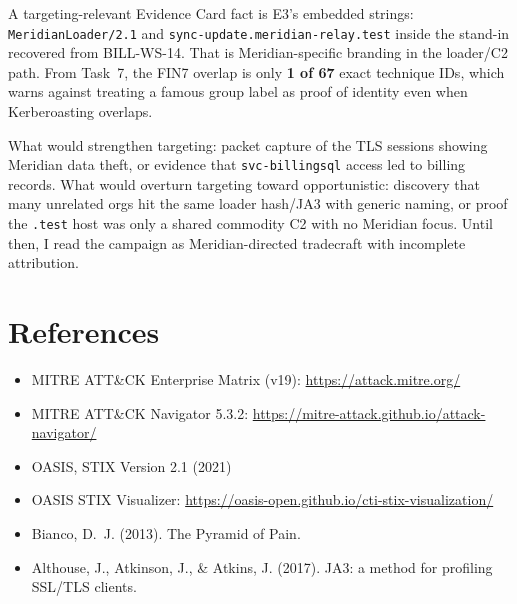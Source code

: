 \documentclass[11pt,letterpaper]{article}
\newcommand{\labpart}[1]{%
  \par\vspace{0.35em}%
  \Needspace{8\baselineskip}%
  \section*{#1}%
  \nopagebreak
}
\begin{document}
A targeting-relevant Evidence Card fact is E3's embedded strings: \texttt{MeridianLoader/2.1} and \texttt{sync-update.meridian-relay.test} inside the stand-in recovered from BILL-WS-14. That is Meridian-specific branding in the loader/C2 path. From Task~7, the FIN7 overlap is only \textbf{1 of 67} exact technique IDs, which warns against treating a famous group label as proof of identity even when Kerberoasting overlaps.

What would strengthen targeting: packet capture of the TLS sessions showing Meridian data theft, or evidence that \texttt{svc-billingsql} access led to billing records. What would overturn targeting toward opportunistic: discovery that many unrelated orgs hit the same loader hash/JA3 with generic naming, or proof the \texttt{.test} host was only a shared commodity C2 with no Meridian focus. Until then, I read the campaign as Meridian-directed tradecraft with incomplete attribution.

\labpart{References}

\begin{itemize}
  \item MITRE ATT\&CK Enterprise Matrix (v19): \url{https://attack.mitre.org/}
  \item MITRE ATT\&CK Navigator 5.3.2: \url{https://mitre-attack.github.io/attack-navigator/}
  \item OASIS, STIX Version 2.1 (2021)
  \item OASIS STIX Visualizer: \url{https://oasis-open.github.io/cti-stix-visualization/}
  \item Bianco, D.~J. (2013). The Pyramid of Pain.
  \item Althouse, J., Atkinson, J., \& Atkins, J. (2017). JA3: a method for profiling SSL/TLS clients.
\end{itemize}
\end{document}
